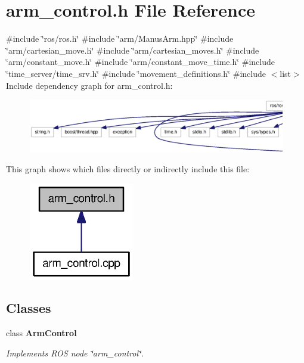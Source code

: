 \section{arm\-\_\-control.\-h \-File \-Reference}
\label{arm__control_8h}
{\ttfamily \#include \char`\"{}ros/ros.\-h\char`\"{}}\*
{\ttfamily \#include \char`\"{}arm/\-Manus\-Arm.\-hpp\char`\"{}}\*
{\ttfamily \#include \char`\"{}arm/cartesian\-\_\-move.\-h\char`\"{}}\*
{\ttfamily \#include \char`\"{}arm/cartesian\-\_\-moves.\-h\char`\"{}}\*
{\ttfamily \#include \char`\"{}arm/constant\-\_\-move.\-h\char`\"{}}\*
{\ttfamily \#include \char`\"{}arm/constant\-\_\-move\-\_\-time.\-h\char`\"{}}\*
{\ttfamily \#include \char`\"{}time\-\_\-server/time\-\_\-srv.\-h\char`\"{}}\*
{\ttfamily \#include \char`\"{}movement\-\_\-definitions.\-h\char`\"{}}\*
{\ttfamily \#include $<$list$>$}\*
\-Include dependency graph for arm\-\_\-control.\-h\-:\nopagebreak
\begin{figure}[H]
\begin{center}
\leavevmode
\includegraphics[width=350pt]{arm__control_8h__incl}
\end{center}
\end{figure}
\-This graph shows which files directly or indirectly include this file\-:\nopagebreak
\begin{figure}[H]
\begin{center}
\leavevmode
\includegraphics[width=130pt]{arm__control_8h__dep__incl}
\end{center}
\end{figure}
\subsection*{\-Classes}
\begin{DoxyCompactItemize}
\item 
class {\bf \-Arm\-Control}
\begin{DoxyCompactList}\small\item\em \-Implements \-R\-O\-S node \char`\"{}arm\-\_\-control\char`\"{}. \end{DoxyCompactList}\end{DoxyCompactItemize}
